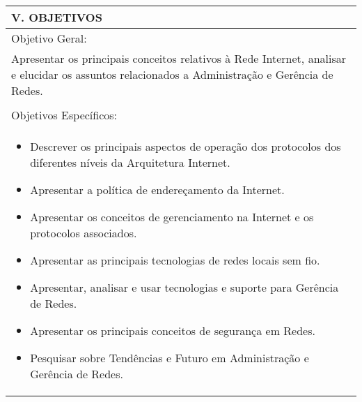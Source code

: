 \documentclass[12pt]{article}
\begin{document}
\begin{longtable}{|L{1.025\textwidth}|} \hline
%
{\bf V. OBJETIVOS } \\ \hline
%
Objetivo Geral:\\

Apresentar os principais conceitos relativos à Rede Internet, analisar e elucidar os assuntos relacionados a Administração e Gerência de Redes.\\
\\
Objetivos Específicos: \\
\begin{itemize}
\item Descrever os principais aspectos de operação dos protocolos dos diferentes níveis da Arquitetura Internet.
\item Apresentar a política de endereçamento da Internet.
\item Apresentar os conceitos de gerenciamento na Internet e os protocolos associados.
\item Apresentar as principais tecnologias de redes locais sem fio.
\item Apresentar, analisar e usar tecnologias e suporte para Gerência de Redes.
\item Apresentar os principais conceitos de segurança em Redes.
\item Pesquisar sobre Tendências e Futuro em Administração e Gerência de Redes.
\end{itemize}

\\ \hline
\end{longtable}
\end{document}
